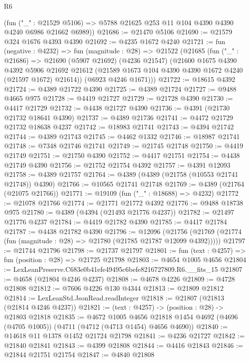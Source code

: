 \begin{lexlean}{R6}
\begin{coremodule}
      (fun ("_" : @21529 @5106) => @5788 @21625 @253 @11 @104 @4390 @4390 @4240 @6986 @21662 @6989))
@21686 := @21470 @5106
@21690 := @21579 @324 @1676 @4393 @4390
@21692 := @4235 @1672 @4240
@21721 := fun (negative : @4232) =>
  fun (magnitude : @28) =>
  @21522
    (@21685
      (fun ("_" : @21686) =>
      @21690
        (@5907 @21692)
        (@4236 @21547)
        (@21600
          @1675
          @4390
          @4392
          @5906
          @21692
          @21612
          (@21589 @1673 @104 @4390 @4390 @1672 @4240 (@21597 @1672) @21614))
        (@6923 @4246 @1671)))
@21722 := @18615 @4392
@21724 := @4389 @21722 @4390
@21725 := @4389 @21724
@21727 := @9488 @4665 @975
@21728 := @4419 @21727
@21729 := @21728 @4390
@21730 := @4417 @21729
@21732 := @4438 @21727 @4390
@21736 := @4391 (@21730 @21732 @18641 @4390)
@21737 := @4389 @21736
@21741 := @4472 @21729 @21732 @18638 @4237
@21742 := @18983 @21741
@21743 := @4394 @21742
@21744 := @4389 @21743
@21745 := @4462 @1332
@21746 := @18987 @21741
@21748 := @7348 @21746 @21741
@21749 := @21745 @21748
@21750 := @4419 @21749
@21751 := @21750 @4390
@21752 := @4417 @21751
@21754 := @4438 @21749 @4390
@21756 := @21752 @21754 @4392
@21757 := @4391 @12093
@21758 := @4389 @21757
@21764 := @4389 (@4389 (@21758 (@10553 @21741 @21748)) @4390)
@21766 := @10565 @21741 @21748
@21769 := @4389 (@21764 (@21075 @21766))
@21771 := @19109 (fun ("_" : @18688) => @4232)
@21772 := @21078 @21766
@21774 := @21771 @21772 @4392
@21776 := @9488 @18738 @975
@21780 := @4389 (@4394 (@21493 @21776 @4237))
@21782 := @21497 @21776 @4237
@21784 := @4419 @21782 @4390
@21785 := @4417 @21784
@21787 := @4438 @21782 @4390
@21796 := @12096
    (@21756 (@21769 (@21774 (fun (magnitude : @28) => @21780 (@21785 @21787 @12099 @4392)))))
@21797 := @21744 @21796
@21798 := @21737 @21797
@21801 := fun (text : @4257) => fun (position : @28) => @21725 @21798
@21803 := @4654 @1005 @4656
@21804 := LexLeanPreserve.C683e0b41efe49495c6befe8216727809.R6.__fits_15
@21807 := @4658 (@21804 @4246 @4237)
@21808 := @4678 @4226
@21809 := @4728 @21808
@21812 := @7606 @4226 @130 @4344
@21813 := @21809 @21812
@21814 := LexLeanStd.JsonRead.readInteger
@21818 := @21807 (@21813 (@21814 @4246 @4237))
@21821 := (text : @4257) -> (position : @28) -> @21803 @21818
@21835 := @4672
    @1005
    @4656
    @21818
    @1454
    @4692
    (@4696 (@4705 @1005))
    (@4711 (@4712 (@4713 @1454) @4656 @4690))
@21840 := @14618 @11 @1378 @1452 @21724 @21798
@21841 := @4236 @21727
@21842 := @21840 @21841
@21843 := @4399 @21808
@21844 := @4416 @21843
@21846 := @21844 @21751 @21754
@21847 := @4840 @21808

\end{coremodule}
\end{lexlean}
